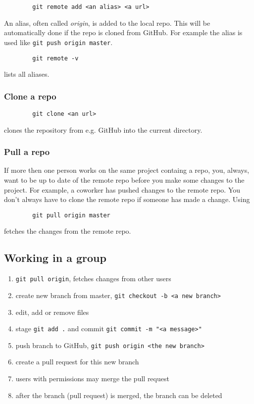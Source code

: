 \documentclass[12pt, twoside]{article}
\begin{document}
	\begin{verbatim}
		git remote add <an alias> <a url>
	\end{verbatim}
	An alias, often called \textit{origin}, is added to the local repo. This will be automatically done if the repo is cloned from GitHub. For example the alias is used like \verb|git push origin master|.
	
	\begin{verbatim}
		git remote -v
	\end{verbatim}
	lists all aliases.
	
	\subsubsection{Clone a repo}
	
	\begin{verbatim}
		git clone <an url>
	\end{verbatim}
	clones the repository from e.g. GitHub into the current directory.
	
	\subsubsection{Pull a repo}
	
	If more then one person works on the same project containg a repo, you, always, want to be up to date of the remote repo before you make some changes to the project. For example, a coworker has pushed changes to the remote repo. You don't always have to clone the remote repo if someone has made a change. Using 
	\begin{verbatim}
		git pull origin master
	\end{verbatim}
	fetches the changes from the remote repo.
	
	\subsection{Working in a group}
	
	\begin{enumerate}
		\item \verb|git pull origin|, fetches changes from other users
		\item create new branch from master, \verb|git checkout -b <a new branch>|
		\item edit, add or remove files
		\item stage \verb|git add .| and commit \verb|git commit -m "<a message>"|
		\item push branch to GitHub, \verb|git push origin <the new branch>|
		\item create a pull request for this new branch
		\item users with permissions may merge the pull request
		\item after the branch (pull request) is merged, the branch can be deleted
	\end{enumerate}
\end{document}
